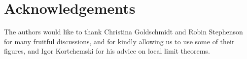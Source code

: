 \section*{Acknowledgements}
The authors would like to thank Christina Goldschmidt and Robin Stephenson for many fruitful discussions, and for kindly allowing us to use some of their figures, and Igor Kortchemski for his advice on local limit theorems.
